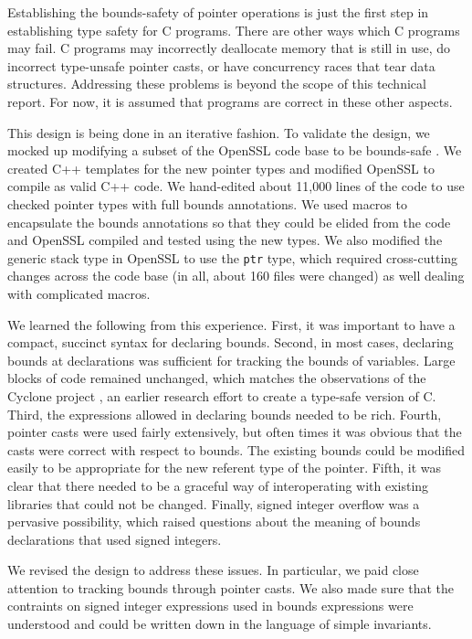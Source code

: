 Establishing the bounds-safety of pointer operations is just the first step in
establishing type safety for C programs. There are other ways which C
programs may fail. C programs may incorrectly deallocate memory that is
still in use, do incorrect type-unsafe pointer casts, or have concurrency
races that tear data structures. Addressing these problems is beyond the
scope of this technical report. For now, it is assumed that programs are
correct in these other aspects.

This design is being done in an iterative fashion.  To validate the
design, we mocked up modifying a subset of the OpenSSL 
code base \cite{OpenSSL2015} to be bounds-safe .  
We created C++ templates for the new pointer types and modified OpenSSL to 
compile as valid C++ code.
We hand-edited about 11,000 lines of the code to use checked pointer
types with full bounds annotations.  We used macros to encapsulate 
the bounds annotations so that they could be elided from the code
and OpenSSL compiled and tested using the new types.  We also modified the
generic stack type in OpenSSL to use the \texttt{ptr} type, which required
cross-cutting changes across the code base (in all, about 160 files were changed) 
as well dealing with complicated macros.   

We learned the following from this
experience.   First, it was important to have a compact, succinct syntax
for declaring bounds. 
Second, in most cases, declaring bounds at declarations was sufficient for 
tracking the bounds of variables.  Large blocks of code 
remained unchanged, which matches the observations of the
Cyclone project \cite{Jim2002}, an earlier research 
effort to create a type-safe version of C.
Third, the expressions allowed in declaring
bounds needed to be rich.  Fourth, pointer casts were used
fairly extensively, but often times it was obvious that the casts were
correct with respect to bounds.  The existing bounds could be modified
easily to be appropriate for the new referent type of the pointer.
Fifth, it was clear that there needed
to be a graceful way of interoperating with existing libraries that could
not be changed.   Finally, signed integer overflow was a pervasive
possibility, which raised questions about the meaning of bounds 
declarations that used signed integers. 

We revised the design to
address these issues.  In particular, we paid close attention to
tracking bounds through pointer casts.  We also made sure that the
contraints on signed integer expressions used in bounds expressions
were understood and could be written down in the language of
simple invariants.


